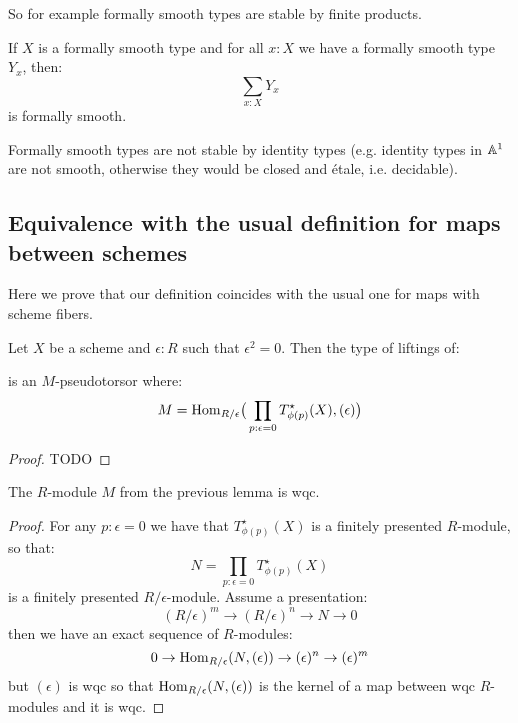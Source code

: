 So for example formally smooth types are stable by finite products. 

\begin{lemma}
If $X$ is a formally smooth type and for all $x:X$ we have a formally smooth type $Y_x$, then:
\[\sum_{x:X}Y_x\]
is formally smooth.
\end{lemma}

Formally smooth types are not stable by identity types (e.g. identity types in $\mathbb{A}^1$ are not smooth, otherwise they would be closed and étale, i.e. decidable).

\subsection{Equivalence with the usual definition for maps between schemes}

Here we prove that our definition coincides with the usual one for maps with scheme fibers.

\begin{lemma}\label{lifting-is-torsor}
Let $X$ be a scheme and $\epsilon:R$ such that $\epsilon^2=0$. Then the type of liftings of:
 \begin{center}
    \end{center} 
is an $M$-pseudotorsor where:
\[M = \mathrm{Hom}_{R/\epsilon}\big(\prod_{p:\epsilon=0}T^\star_{\phi(p)}(X),(\epsilon)\big)\]
\end{lemma}

\begin{proof}
TODO
\end{proof}

\begin{lemma}\label{M-is-wqc}
The $R$-module $M$ from the previous lemma is wqc.
\end{lemma}

\begin{proof}
For any $p:\epsilon=0$ we have that $T^\star_{\phi(p)}(X)$ is a finitely presented $R$-module, so that:
\[N = \prod_{p:\epsilon=0}T^\star_{\phi(p)}(X)\]
is a finitely presented $R/\epsilon$-module. Assume a presentation:
\[
(R/\epsilon)^m \to (R/\epsilon)^n\to N\to 0
\]
then we have an exact sequence of $R$-modules:
\[
0\to \mathrm{Hom}_{R/\epsilon}(N,(\epsilon)) \to (\epsilon)^n\to (\epsilon)^m
\]
but $(\epsilon)$ is wqc so that $\mathrm{Hom}_{R/\epsilon}(N,(\epsilon))$ is the kernel of a map between wqc $R$-modules and it is wqc.
\end{proof}

